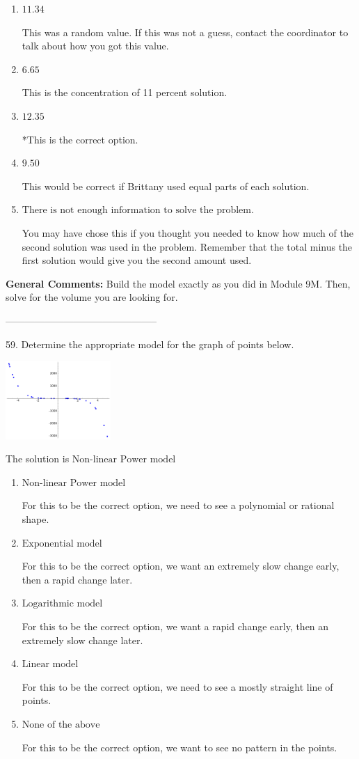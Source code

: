 \documentclass{extbook}[14pt]
\begin{document}
\begin{enumerate}[label=\Alph*.] 
\item $ 11.34 $ 

 This was a random value. If this was not a guess, contact the coordinator to talk about how you got this value. 
\item $ 6.65 $ 

 This is the concentration of 11 percent solution. 
\item $ 12.35 $ 

 *This is the correct option. 
\item $ 9.50 $ 

 This would be correct if Brittany used equal parts of each solution. 
\item $ \text{There is not enough information to solve the problem.} $ 

 You may have chose this if you thought you needed to know how much of the second solution was used in the problem. Remember that the total minus the first solution would give you the second amount used. 
\end{enumerate} 
 
\textbf{General Comments:} Build the model exactly as you did in Module 9M. Then, solve for the volume you are looking for.

-----------------------------------------------

59. Determine the appropriate model for the graph of points below.
\begin{center} \includegraphics[width=0.3\textwidth]{../Figures/identifyModelGraph12C.png} \end{center} 

The solution is $ \text{Non-linear Power model} $ 

\begin{enumerate}[label=\Alph*.] 
\item $ \text{Non-linear Power model} $ 

 For this to be the correct option, we need to see a polynomial or rational shape. 
\item $ \text{Exponential model} $ 

 For this to be the correct option, we want an extremely slow change early, then a rapid change later. 
\item $ \text{Logarithmic model} $ 

 For this to be the correct option, we want a rapid change early, then an extremely slow change later. 
\item $ \text{Linear model} $ 

 For this to be the correct option, we need to see a mostly straight line of points. 
\item $ \text{None of the above} $ 

 For this to be the correct option, we want to see no pattern in the points. 
\end{enumerate} 
 
\end{document}

